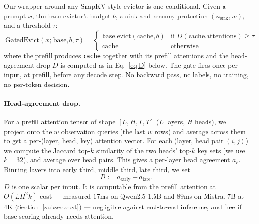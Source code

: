 \documentclass{article}
\begin{document}
Our wrapper around any SnapKV-style evictor is one conditional. Given a prompt
$x$, the base evictor's budget $b$, a sink-and-recency protection
$(n_{\text{sink}}, w)$, and a threshold $\tau$:
\begin{equation}
\boxed{\
\text{GatedEvict}(x;\, \text{base}, b, \tau) =
\begin{cases}
\text{base.evict}(\text{cache}, b) & \text{if } D(\text{cache}.\text{attentions}) \ge \tau \\
\text{cache} & \text{otherwise}
\end{cases}\
}
\end{equation}
where the prefill produces \texttt{cache} together with its prefill attentions
and the head-agreement drop $D$ is computed as in Eq.~\eqref{eq:D} below.
The gate fires once per input, at prefill, before any decode step. No backward
pass, no labels, no training, no per-token decision.

\paragraph{Head-agreement drop.} For a prefill attention tensor of shape
$[L, H, T, T]$ ($L$ layers, $H$ heads), we project onto the $w$ observation
queries (the last $w$ rows) and average across them to get a per-(layer, head,
key) attention vector. For each (layer, head pair $(i, j)$) we compute the
Jaccard top-$k$ similarity of the two heads' top-$k$ key sets (we use $k = 32$),
and average over head pairs. This gives a per-layer head agreement
$a_\ell$. Binning layers into early third, middle third, late third, we set
\begin{equation}
\label{eq:D}
D := a_{\text{early}} - a_{\text{late}}.
\end{equation}
$D$ is one scalar per input. It is computable from the prefill attention at
$O(L H^2 k)$ cost --- measured $17$ms on Qwen2.5-1.5B and $89$ms on
Mistral-7B at 4K (Section~\ref{subsec:cost}) --- negligible against
end-to-end inference, and free if base scoring already needs attention.
\end{document}
